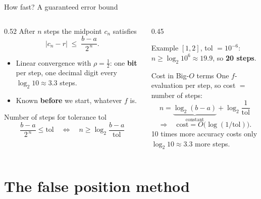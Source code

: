 \documentclass[aspectratio=169]{beamer}
\begin{document}
\begin{frame}{How fast? A guaranteed error bound}
\begin{columns}[T]
\begin{column}{0.52\textwidth}
\small
After $n$ steps the midpoint $c_n$ satisfies
\[
|c_n - r| \;\le\; \frac{b-a}{2^{\,n}} .
\]
\begin{itemize}
  \item Linear convergence with $\rho = \tfrac12$: one \textbf{bit} per step, one decimal digit every $\log_2 10 \approx 3.3$ steps.
  \item Known \textbf{before} we start, whatever $f$ is.
\end{itemize}
\begin{block}{Number of steps for tolerance tol}
\[
\frac{b-a}{2^{\,n}} \le \text{tol}
\quad\Longleftrightarrow\quad
n \ge \log_2\!\frac{b-a}{\text{tol}}
\]
\end{block}
\end{column}
\begin{column}{0.45\textwidth}
\begin{exampleblock}{Example}
\footnotesize $[1,2]$, tol $= 10^{-6}$: \ $n \ge \log_2 10^6 \approx 19.9$, so \textbf{20 steps}.
\end{exampleblock}
\vspace{0.1cm}
\begin{block}{Cost in Big-$O$ terms}
\footnotesize One $f$-evaluation per step, so cost $=$ number of steps:
\[
n = \underbrace{\log_2(b-a)}_{\text{constant}} + \log_2\frac{1}{\text{tol}}
\]
\[
\Longrightarrow\quad \text{cost} = O\big(\log(1/\text{tol})\big).
\]
10 times more accuracy costs only $\log_2 10 \approx 3.3$ more steps.
\end{block}
\end{column}
\end{columns}
\end{frame}

\section{The false position method}
\end{document}
